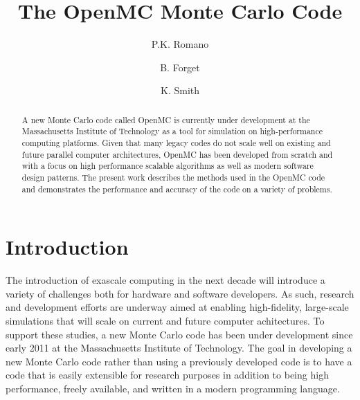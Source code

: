 \documentclass{elsarticle}
\begin{document}
\title{The OpenMC Monte Carlo Code}
\author[mit]{P.K. Romano}

\author[mit]{B. Forget}

\author[mit]{K. Smith}

\address[mit]{Massachusetts Institute of Technology, Department of Nuclear
  Science and Engineering, 77 Massachusetts Avenue, Building 24-213, Cambridge,
  MA 02141}

\begin{abstract}
A new Monte Carlo code called OpenMC is currently under development at the
Massachusetts Institute of Technology as a tool for simulation on
high-performance computing platforms. Given that many legacy codes do not scale
well on existing and future parallel computer architectures, OpenMC has been
developed from scratch and with a focus on high performance scalable algorithms
as well as modern software design patterns. The present work describes the
methods used in the OpenMC code and demonstrates the performance and accuracy of
the code on a variety of problems.
\end{abstract}

\maketitle

\section{Introduction}

The introduction of exascale computing in the next decade will introduce a
variety of challenges both for hardware and software developers. As such,
research and development efforts are underway aimed at enabling high-fidelity,
large-scale simulations that will scale on current and future computer
achitectures. To support these studies, a new Monte Carlo code has been under
development since early 2011 at the Massachusetts Institute of Technology. The
goal in developing a new Monte Carlo code rather than using a previously
developed code is to have a code that is easily extensible for research purposes
in addition to being high performance, freely available, and written in a modern
programming language.
\end{document}
